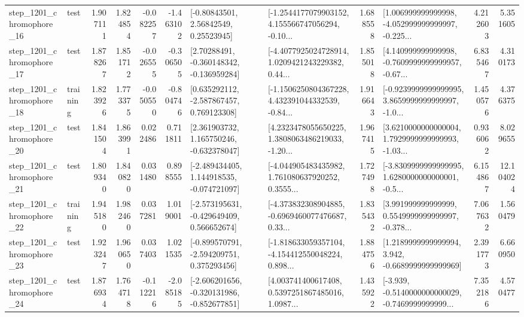 \begin{tabular}{llrrrrllrlrr}
 step\_1201\_chromophore\_16 &      test &      1.907111 &    1.824854 &     -0.082257 & -1.463102 &       [-0.80843501, 2.56842549, 0.25523945] &  [-1.2544177079903152, 4.155566747056294, -0.10... &       1.688558 &  [1.006999999999998, -4.052999999999997, -0.225... &            4.212603 &          5.351605 \\
 step\_1201\_chromophore\_17 &      test &      1.878267 &    1.851712 &     -0.026555 & -0.306505 &    [2.70288491, -0.360148342, -0.136959284] &  [-4.4077925024728914, 1.0209421243229382, 0.44... &       1.855018 &  [4.140999999999998, -0.7609999999999957, -0.67... &            6.835467 &          4.310173 \\
 step\_1201\_chromophore\_18 &  training &      1.823926 &    1.773375 &     -0.050550 & -0.804746 &    [0.635292112, -2.587867457, 0.769123308] &  [-1.1506250804367228, 4.432391044332539, -0.84... &       1.916643 &  [-0.9239999999999995, 3.8659999999999997, -1.0... &            1.450576 &          4.376375 \\
 step\_1201\_chromophore\_20 &      test &      1.841504 &    1.863991 &      0.022486 &  0.711811 &    [2.361903732, 1.165750246, -0.632378047] &  [4.2323478055650225, 1.3808063486219033, -1.20... &       1.967415 &  [3.6210000000000004, 1.7929999999999993, -1.03... &            0.936062 &          8.029655 \\
 step\_1201\_chromophore\_21 &      test &      1.809340 &    1.840820 &      0.031480 &  0.898555 &   [-2.489434405, 1.144918535, -0.074721097] &  [-4.044905483435982, 1.761080637920252, 0.3555... &       1.727498 &  [-3.8309999999999995, 1.6280000000000001, -0.5... &            6.154867 &         12.104024 \\
 step\_1201\_chromophore\_22 &  training &      1.945180 &    1.982460 &      0.037281 &  1.019001 &   [-2.573195631, -0.429649409, 0.566652674] &  [-4.373832308904885, -0.6969460077476687, 0.33... &       1.835432 &  [3.991999999999999, 0.5549999999999997, -0.378... &            7.067632 &          1.560479 \\
 step\_1201\_chromophore\_23 &      test &      1.923247 &    1.960650 &      0.037403 &  1.021535 &   [-0.899570791, -2.594209751, 0.375293456] &  [-1.818633059357104, -4.154412550048224, 0.898... &       1.884756 &   [1.2189999999999994, 3.942, -0.6689999999999969] &            2.391773 &          6.660950 \\
 step\_1201\_chromophore\_24 &      test &      1.876934 &    1.764718 &     -0.112216 & -2.085185 &  [-2.606201656, -0.320131986, -0.852677851] &  [4.003741400617408, 0.5397251867485016, 1.0987... &       1.435922 &  [-3.939, -0.5140000000000029, -0.7469999999999... &            7.352186 &          4.570477 \\

\end{tabular}
